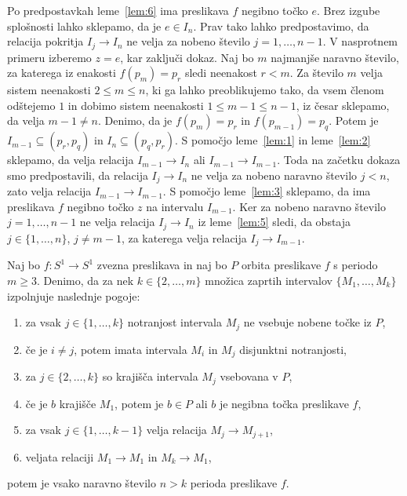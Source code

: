 \documentclass[../TG_magistrsko_delo_sections.tex]{subfiles}
\begin{document}
\begin{dokaz}
Po predpostavkah leme~\ref{lem:6} ima preslikava $f$ negibno točko $e$. Brez izgube splošnosti lahko sklepamo, da je $e \in I_n$. Prav tako lahko predpostavimo, da relacija pokritja $I_j \to I_n$ ne velja za nobeno število $j = 1, \dots, n-1$. V nasprotnem primeru izberemo $z=e$, kar zaključi dokaz.
Naj bo $m$ najmanjše naravno število, za katerega iz enakosti $f(p_m) = p_r$ sledi neenakost $r < m$. Za število $m$ velja sistem neenakosti $2 \leq m \leq n$, ki ga lahko preoblikujemo tako, da vsem členom odštejemo $1$ in dobimo sistem neenakosti $1 \leq m -1 \leq n-1$, iz česar sklepamo, da velja $m-1 \neq n$. Denimo, da je $f(p_m) = p_r$ in $f(p_{m-1}) = p_q$. Potem je $I_{m-1} \subseteq (p_r, p_q)$ in $I_n \subseteq (p_q, p_r)$. S pomočjo leme~\ref{lem:1} in leme~\ref{lem:2} sklepamo, da velja relacija $I_{m-1} \to I_n$ ali $I_{m-1} \to I_{m-1}$. Toda na začetku dokaza smo predpostavili, da relacija $I_{j} \to I_n$ ne velja za nobeno naravno število $j < n$, zato velja relacija $I_{m-1} \to I_{m-1}$. S pomočjo leme~\ref{lem:3} sklepamo, da ima preslikava $f$ negibno točko $z$ na intervalu $I_{m-1}$. Ker za nobeno naravno število $j = 1, \dots, n-1$ ne velja relacija $I_j \to I_n$ iz leme~\ref{lem:5} sledi, da obstaja $j \in \{1, \dots, n\}$, $j \neq m-1$, za katerega velja relacija $I_j \to I_{m-1}$.

\end{dokaz}

\begin{lema}\label{lem:7}		%
Naj bo $f : S^1 \to S^1$ zvezna preslikava in naj bo $P$ orbita preslikave $f$ s periodo $m \geq 3$. Denimo, da za nek $k \in \{2, \dots, m\}$ množica zaprtih intervalov $\{M_1, \dots, M_k\}$ izpolnjuje naslednje pogoje:
\begin{enumerate}
\item za vsak $j \in \{1, \dots, k\}$ notranjost intervala $M_j$ ne vsebuje nobene točke iz $P$,\label{enum:p1}
\item če je $i \neq j$, potem imata intervala $M_i$ in $M_j$ disjunktni notranjosti,\label{enum:p2}
\item za $j \in \{2, \dots, k\}$ so krajišča intervala $M_j$ vsebovana v $P$,\label{enum:p3}
\item če je $b$ krajišče $M_1$, potem je $b \in P$ ali $b$ je negibna točka preslikave $f$,\label{enum:p4}
\item za vsak $j \in \{1, \dots, k-1 \}$ velja relacija $M_j \to M_{j+1}$,\label{enum:p5}
\item veljata relaciji $M_1 \to M_1$ in $M_k \to M_1$,\label{enum:p6}
\end{enumerate}
potem je vsako naravno število $n > k$ perioda preslikave $f$.
\end{lema}
\end{document}
